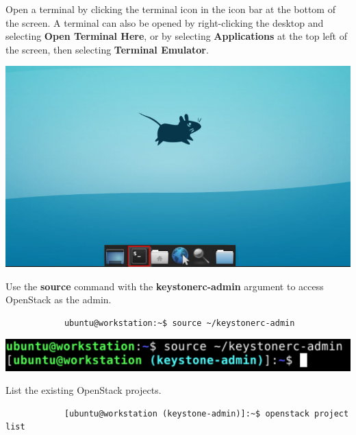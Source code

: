 \documentclass[letterpaper, 12pt]{article}
\begin{document}
\begin{enumerate}
    \begin{labstep}
        Open a terminal by clicking the terminal icon in the icon bar at the bottom of the screen.
        A terminal can also be opened by right-clicking the desktop and selecting \textbf{Open Terminal Here}, or by selecting \textbf{Applications} at the top left of the screen, then selecting \textbf{Terminal Emulator}.

        \begin{center}
            \includegraphics[width=\linewidth]{images/part2/step1.png}
        \end{center}
    \end{labstep}

    \begin{labstep}
        Use the \textbf{source} command with the \textbf{keystonerc-admin} argument to access OpenStack as the admin.
        \begin{lstlisting}
            ubuntu@workstation:~$ source ~/keystonerc-admin
        \end{lstlisting}

        \begin{center}
            \includegraphics[width=\linewidth]{images/part2/step2.png}
        \end{center}
    \end{labstep}

    \begin{labstep}
        List the existing OpenStack projects.
        \begin{lstlisting}
            [ubuntu@workstation (keystone-admin)]:~$ openstack project list
        \end{lstlisting}


\end{labstep}
\end{enumerate}
\end{document}
